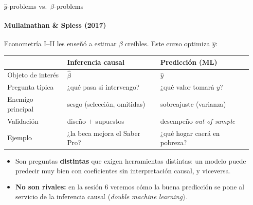\documentclass{beamer}
\newcommand{\1}{\mathbb{I}}
\begin{document}
\begin{frame}{$\hat{y}$-problems vs.\ $\beta$-problems}
\framesubtitle{Mullainathan \& Spiess (2017)}
\small
Econometría I--II les enseñó a estimar $\beta$ creíbles. Este curso optimiza $\hat{y}$:

\vspace{0.2cm}
\begin{center}
\footnotesize
\begin{tabular}{lll}
\hline
 & \textbf{Inferencia causal} & \textbf{Predicción (ML)} \\
\hline
Objeto de interés & $\hat{\beta}$ & $\hat{y}$ \\
Pregunta típica & ¿qué pasa si intervengo? & ¿qué valor tomará $y$? \\
Enemigo principal & sesgo (selección, omitidas) & sobreajuste (varianza) \\
Validación & diseño $+$ supuestos & desempeño \emph{out-of-sample} \\
Ejemplo & ¿la beca mejora el Saber Pro? & ¿qué hogar caerá en pobreza? \\
\hline
\end{tabular}
\end{center}
\pause

\vspace{0.3cm}
\begin{itemize}\itemsep3pt
  \item Son preguntas \textbf{distintas} que exigen herramientas distintas: un modelo puede predecir muy bien con coeficientes sin interpretación causal, y viceversa.
  \item \textbf{No son rivales:} en la sesión 6 veremos cómo la buena predicción se pone al servicio de la inferencia causal (\emph{double machine learning}).
\end{itemize}
\end{frame}
\end{document}
